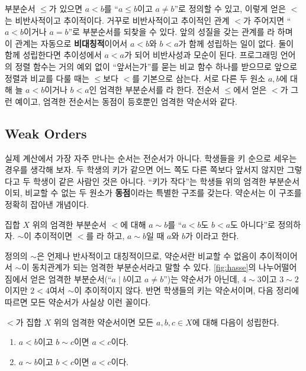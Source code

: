 부분순서 $\le$가 있으면 $a<b$를 ``$a\le b$이고 $a\ne b$''로 정의할 수 있고, 이렇게 얻은 $<$는 비반사적이고 추이적이다. 거꾸로 비반사적이고 추이적인 관계 $<$가 주어지면 ``$a<b$이거나 $a=b$''로 부분순서를 되찾을 수 있다. 앞의 성질을 갖는 관계를 라 하며 이 관계는 자동으로 \textbf{비대칭적}이어서 $a<b$와 $b<a$가 함께 성립하는 일이 없다. 둘이 함께 성립한다면 추이성에서 $a<a$가 되어 비반사성과 모순이 된다. 프로그래밍 언어의 정렬 함수는 거의 예외 없이 ``앞서는가''를 묻는 비교 함수 하나를 받으므로 앞으로 정렬과 비교를 다룰 때는 $\le$보다 $<$를 기본으로 삼는다. 서로 다른 두 원소 $a,b$에 대해 늘 $a<b$이거나 $b<a$인 엄격한 부분순서를 라 한다. 전순서 $\le$에서 얻은 $<$가 그런 예이고, 엄격한 전순서는 동점이 등호뿐인 엄격한 약순서와 같다.

\subsection{Weak Orders}

실제 계산에서 가장 자주 만나는 순서는 전순서가 아니다. 학생들을 키 순으로 세우는 경우를 생각해 보자. 두 학생의 키가 같으면 어느 쪽도 다른 쪽보다 앞서지 않지만 그렇다고 두 학생이 같은 사람인 것은 아니다. ``키가 작다''는 학생들 위의 엄격한 부분순서이되, 비교할 수 없는 두 원소가 \textbf{동점}이라는 특별한 구조를 갖는다. 약순서는 이 구조를 정확히 잡아낸 개념이다.

\begin{definition}[약순서]
\label{def:weak-order}
집합 $X$ 위의 엄격한 부분순서 $<$에 대해 $a\sim b$를 ``$a<b$도 $b<a$도 아니다''로 정의하자. $\sim$이 추이적이면 $<$를 라 하고, $a\sim b$일 때 $a$와 $b$가 이라고 한다.
\end{definition}

정의의 $\sim$은 언제나 반사적이고 대칭적이므로, 약순서란 비교할 수 없음이 추이적이어서 $\sim$이 동치관계가 되는 엄격한 부분순서라고 말할 수 있다. \cref{fig:hasse}의 나누어떨어짐에서 얻은 엄격한 부분순서(``$a\mid b$이고 $a\ne b$'')는 약순서가 아닌데, $4\sim 3$이고 $3\sim 2$이지만 $2<4$여서 $\sim$이 추이적이지 않다. 반면 학생들의 키는 약순서이며, 다음 정리에 따르면 모든 약순서가 사실상 이런 꼴이다.

\begin{lemma}
\label{lem:weak-mix}
$<$가 집합 $X$ 위의 엄격한 약순서이면 모든 $a,b,c\in X$에 대해 다음이 성립한다.
\begin{enumerate}
\item $a<b$이고 $b\sim c$이면 $a<c$이다.
\item $a\sim b$이고 $b<c$이면 $a<c$이다.
\end{enumerate}
\end{lemma}

